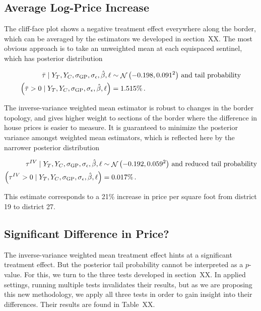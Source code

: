 \documentclass[letter]{article}
\newcommand{\genericdel}[3]{%
      \left#1#3\right#2
    }
\newcommand{\del}[1]{\genericdel(){#1}}
\let\Pr\relax
\DeclareMathOperator{\Pr}{\mathbb{P}}
\DeclareMathOperator{\normal}{\mathcal{N}}
\newcommand{\sigmaf}{\sigma_{\mathrm{GP}}}
\newcommand{\sigman}{\sigma_{\epsilon}}
\newcommand{\linavg}{\bar{\tau}}
\newcommand{\invvar}{\tau^{IV}}
\begin{document}
    	\subsection{Average Log-Price Increase}\label{average-log-price-increase}

The cliff-face plot shows a negative treatment effect everywhere along the border, which can be averaged by the estimators we developed in section~XX. The most obvious approach is to take an unweighted mean at each equispaced sentinel, which has posterior distribution

\begin{equation}
\begin{split}
    \linavg \mid Y_T, Y_C, \sigmaf, \sigman, \hat{\beta}, \ell &\sim \normal\del{-0.198, 0.091^2}\,\text{and tail probability} \\
    \Pr\del{\linavg > 0 \mid Y_T, Y_C, \sigmaf, \sigman, \hat{\beta}, \ell} &= 1.515\% \,.
\end{split}
\end{equation}

The inverse-variance weighted mean estimator is robust to changes in the border topology, and gives higher weight to sections of the border where the difference in house prices is easier to measure. It is guaranteed to minimize the posterior variance amongst weighted mean estimators, which is reflected here by the narrower posterior distribution

\begin{equation}
\begin{split}
    \invvar \mid Y_T, Y_C, \sigmaf, \sigman, \hat{\beta}, \ell &\sim \normal\del{-0.192, 0.059^2}\,\text{and reduced tail probability} \\
    \Pr\del{\invvar > 0 \mid Y_T, Y_C, \sigmaf, \sigman, \hat{\beta}, \ell} &= 0.017\% \,.
\end{split}
\end{equation}

This estimate corresponds to a 21\% increase in price per square foot from district 19 to district 27.
    


    	\subsection{Significant Difference in Price?}\label{significant-difference-in-price}

The inverse-variance weighted mean treatment effect hints at a significant treatment effect.
But the posterior tail probability cannot be interpreted as a \(p\)-value.
For this, we turn to the three tests developed in section~XX.
In applied settings, running multiple tests invalidates their results,
but as we are proposing this new methodology,
we apply all three tests in order to gain insight into their differences.
Their results are found in Table~XX.
\end{document}
